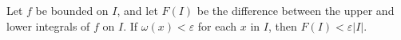Let $f$ be bounded on $I$, and let $F(I)$ be the difference between the upper and lower integrals of $f$ on $I$. If $\omega(x) < \varepsilon$ for each $x$ in $I$, then $F(I) < \varepsilon|I|$.
